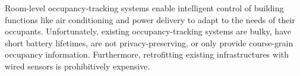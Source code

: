 Room-level occupancy-tracking systems enable intelligent control of building functions like air conditioning and power delivery to adapt to the needs of their occupants.
Unfortunately, existing occupancy-tracking systems are bulky, have short battery lifetimes, are not privacy-preserving, or only provide course-grain occupancy information.
Furthermore, retrofitting existing infrastructures with wired sensors is prohibitively expensive. %

